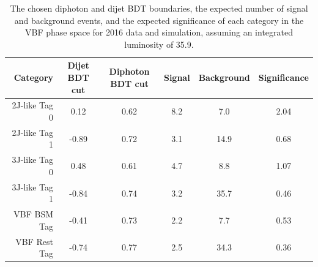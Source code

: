 \begin{table}
  \begin{centering}
    \begin{tabular}{ r | c | c | c | c | c } 
    \hline 
    Category       & Dijet BDT cut & Diphoton BDT cut & Signal & Background & Significance \\ 
    \hline 
    2J-like  Tag 0 & 0.12         & 0.62             & 8.2    & 7.0        & 2.04         \\
    2J-like  Tag 1 & -0.89        & 0.72             & 3.1    & 14.9       & 0.68         \\
    3J-like  Tag 0 & 0.48         & 0.61             & 4.7    & 8.8        & 1.07         \\
    3J-like  Tag 1 & -0.84        & 0.74             & 3.2    & 35.7       & 0.46         \\
    VBF BSM  Tag   & -0.41        & 0.73             & 2.2    & 7.7        & 0.53         \\
    VBF Rest Tag   & -0.74        & 0.77             & 2.5    & 34.3       & 0.36         \\
    \hline 
    \end{tabular}
    \caption{The chosen diphoton and dijet BDT boundaries, 
    the expected number of signal and background events, 
    and the expected significance of each category in the VBF phase space 
    for 2016 data and simulation, assuming an integrated luminosity of \SI{35.9}{\fbinv}.}
    \label{tab:cat_VBFcuts2016}
  \end{centering}
\end{table}

